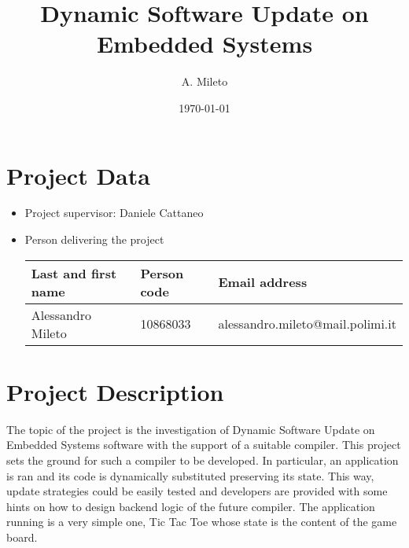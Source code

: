 \documentclass[10pt,a4]{article}
\author{A. Mileto}
\date{\today}
\title{Dynamic Software Update on Embedded Systems}
\begin{document}
\maketitle

\begingroup %
\color{black}%
\tableofcontents
\endgroup   %

\pagebreak

\section{Project Data}
\begin{itemize}
\item 
  Project supervisor: Daniele Cattaneo
\item Person delivering the project

\begin{center}
\begin{tabular}{lll}
Last and first name & Person code & Email address\\
\hline
  Alessandro Mileto & 10868033 & alessandro.mileto@mail.polimi.it \\                     
\end{tabular}
\end{center}

\end{itemize}



\section{Project Description}
The topic of the project is the investigation of Dynamic Software Update on Embedded Systems software with the support of a suitable compiler. This project sets the ground for such a compiler to be developed. In particular, an application is ran and its code is dynamically substituted preserving its state. This way, update strategies could be easily tested and developers are provided with some hints on how to design backend logic of the future compiler. The application running is a very simple one, Tic Tac Toe whose state is the content of the game board. 
\end{document}
